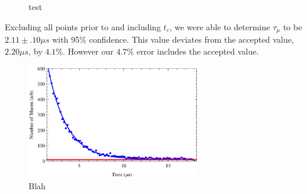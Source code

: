 \begin{figure}[htbp]
\begin{center}
\hspace{-2mm}
\vspace{-2mm}
\vspace{-2mm}
\caption{test}
\label{autocorr}
\end{center}
\end{figure}

Excluding all points prior to and including $t_{c}$, we were able to determine $\tau_{\mu}$ to be $2.11 \pm .10 \mu s$ with 95\% confidence.  This value deviates from the accepted value, $2.20\mu s$, by $4.1\%$.  However our $4.7\%$ error includes the accepted value.

\begin{figure}[htbp]
\begin{center}
\includegraphics[height=50mm]{./figures/muon_decay.eps}
\caption{Blah}
\label{figure:logic}
\end{center}
\end{figure}


